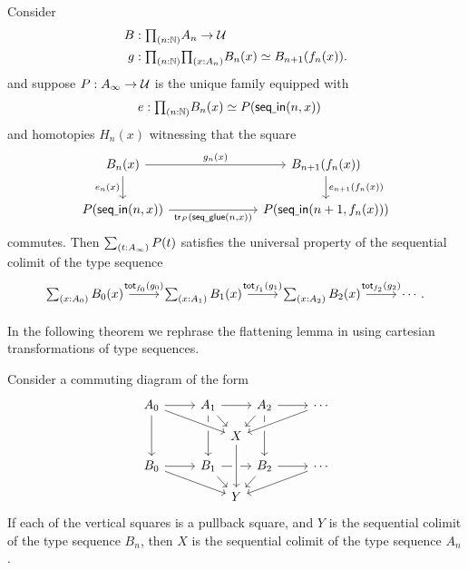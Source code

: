 \begin{lem}
Consider
\begin{align*}
B & : \prd{n:\N}A_n\to\UU \\
g & : \prd{n:\N}{x:A_n}\eqv{B_n(x)}{B_{n+1}(f_n(x))}.
\end{align*}
and suppose $P:A_\infty\to\mathcal{U}$ is the unique family equipped with
\begin{align*}
e & : \prd{n:\N}\eqv{B_n(x)}{P(\mathsf{seq\usc{}in}(n,x))}
\end{align*}
and homotopies $H_n(x)$ witnessing that the square
\begin{equation*}
\begin{tikzcd}[column sep=7em]
B_n(x) \arrow[r,"g_n(x)"] \arrow[d,swap,"e_n(x)"] & B_{n+1}(f_n(x)) \arrow[d,"e_{n+1}(f_n(x))"] \\
P(\mathsf{seq\usc{}in}(n,x)) \arrow[r,swap,"{\mathsf{tr}_P(\mathsf{seq\usc{}glue}(n,x))}"] & P(\mathsf{seq\usc{}in}(n+1,f_n(x)))
\end{tikzcd}
\end{equation*}
commutes. Then $\sm{t:A_\infty}P(t)$ satisfies the universal property of the sequential colimit of the type sequence
\begin{equation*}
\begin{tikzcd}
\sm{x:A_0}B_0(x) \arrow[r,"{\total[f_0]{g_0}}"] & \sm{x:A_1}B_1(x) \arrow[r,"{\total[f_1]{g_1}}"] & \sm{x:A_2}B_2(x) \arrow[r,"{\total[f_2]{g_2}}"] & \cdots.
\end{tikzcd}
\end{equation*}
\end{lem}

In the following theorem we rephrase the flattening lemma in using cartesian transformations of type sequences.

\begin{thm}
Consider a commuting diagram of the form
\begin{equation*}
\begin{tikzcd}[column sep=small,row sep=small]
A_0 \arrow[rr] \arrow[dd] & & A_1 \arrow[rr] \arrow[dr] \arrow[dd] &[-.9em] &[-.9em] A_2 \arrow[dl] \arrow[dd] & & \cdots \\
& & & X \arrow[from=ulll,crossing over] \arrow[from=urrr,crossing over] \arrow[from=ur,to=urrr] \\
B_0 \arrow[rr] \arrow[drrr] & & B_1 \arrow[rr] \arrow[dr] & & B_2 \arrow[rr] \arrow[dl] & & \cdots \arrow[dlll] \\
& & & Y \arrow[from=uu,crossing over] 
\end{tikzcd}
\end{equation*}
If each of the vertical squares is a pullback square, and $Y$ is the sequential colimit of the type sequence $B_n$, then $X$ is the sequential colimit of the type sequence $A_n$. 
\end{thm}

